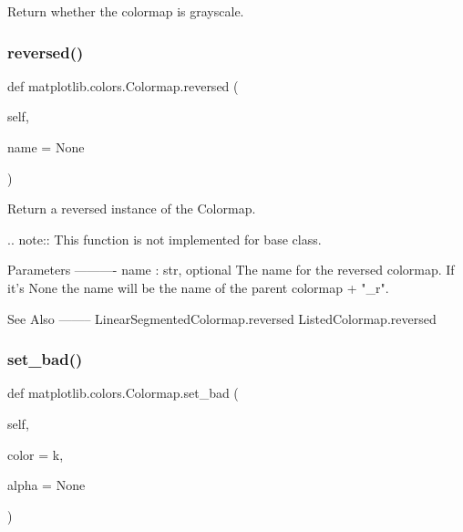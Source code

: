 \begin{DoxyVerb}Return whether the colormap is grayscale.\end{DoxyVerb}
 \mbox{\label{classmatplotlib_1_1colors_1_1Colormap_a4d568231f3fa026884c1cf80cf984dc2}} 
\subsubsection{\texorpdfstring{reversed()}{reversed()}}
{\footnotesize\ttfamily def matplotlib.\+colors.\+Colormap.\+reversed (\begin{DoxyParamCaption}\item[{}]{self,  }\item[{}]{name = {\ttfamily None} }\end{DoxyParamCaption})}

\begin{DoxyVerb}Return a reversed instance of the Colormap.

.. note:: This function is not implemented for base class.

Parameters
----------
name : str, optional
    The name for the reversed colormap. If it's None the
    name will be the name of the parent colormap + "_r".

See Also
--------
LinearSegmentedColormap.reversed
ListedColormap.reversed
\end{DoxyVerb}
 \mbox{\label{classmatplotlib_1_1colors_1_1Colormap_adef213282b895fa8918f6301adab8788}} 
\subsubsection{\texorpdfstring{set\+\_\+bad()}{set\_bad()}}
{\footnotesize\ttfamily def matplotlib.\+colors.\+Colormap.\+set\+\_\+bad (\begin{DoxyParamCaption}\item[{}]{self,  }\item[{}]{color = {\ttfamily \textquotesingle{}k\textquotesingle{}},  }\item[{}]{alpha = {\ttfamily None} }\end{DoxyParamCaption})}

